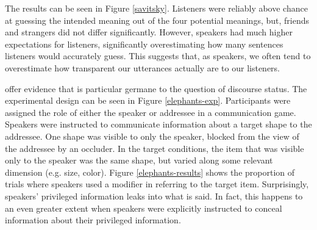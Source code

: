 \documentclass[12pt]{upenndiss}
\theoremstyle{definition} \newtheorem{definition}{Definition}
\begin{document}
The results can be seen in Figure \ref{savitsky}. Listeners were reliably above chance at guessing the intended meaning out of the four potential meanings, but, friends and strangers did not differ significantly. However, speakers had much higher expectations  for listeners, significantly overestimating how many sentences listeners would accurately guess. This suggests that, as speakers, we often tend to overestimate how transparent our utterances actually are to our listeners.




\cite{lane-etal2006} offer evidence that is particular germane to the question of discourse status. The experimental design can be seen in Figure \ref{elephants-exp}. Participants were assigned the role of either the speaker or addressee in a communication game. Speakers were instructed to communicate information about a target shape to the addressee. One shape was visible to only the speaker, blocked from the view of the addressee by an occluder. In the target conditions, the item that was visible only to the speaker was the same shape, but varied along some relevant dimension (e.g. size, color). Figure \ref{elephants-results} shows the proportion of trials where speakers used a modifier in referring to the target item. Surprisingly, speakers' privileged information leaks into what is said. In fact, this happens to an even greater extent when speakers were explicitly instructed to conceal information about their privileged information.




\end{document}
